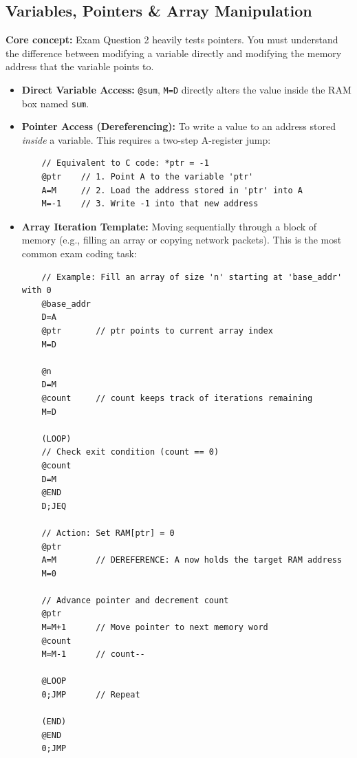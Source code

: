\documentclass[12pt,a4paper]{article}
\begin{document}
\subsection{Variables, Pointers \& Array Manipulation}
\textbf{Core concept:} Exam Question 2 heavily tests pointers. You must understand the difference between modifying a variable directly and modifying the memory address that the variable points to.
\begin{itemize}
    \item \textbf{Direct Variable Access:} \texttt{@sum}, \texttt{M=D} directly alters the value inside the RAM box named \texttt{sum}.
    \item \textbf{Pointer Access (Dereferencing):} To write a value to an address stored \textit{inside} a variable. This requires a two-step A-register jump:
    \begin{verbatim}
    // Equivalent to C code: *ptr = -1
    @ptr    // 1. Point A to the variable 'ptr'
    A=M     // 2. Load the address stored in 'ptr' into A
    M=-1    // 3. Write -1 into that new address
    \end{verbatim}
    \item \textbf{Array Iteration Template:} Moving sequentially through a block of memory (e.g., filling an array or copying network packets). This is the most common exam coding task:
    \begin{verbatim}
    // Example: Fill an array of size 'n' starting at 'base_addr' with 0
    @base_addr
    D=A
    @ptr       // ptr points to current array index
    M=D
    
    @n
    D=M
    @count     // count keeps track of iterations remaining
    M=D
    
    (LOOP)
    // Check exit condition (count == 0)
    @count
    D=M
    @END
    D;JEQ
    
    // Action: Set RAM[ptr] = 0
    @ptr
    A=M        // DEREFERENCE: A now holds the target RAM address
    M=0
    
    // Advance pointer and decrement count
    @ptr
    M=M+1      // Move pointer to next memory word
    @count
    M=M-1      // count--
    
    @LOOP
    0;JMP      // Repeat
    
    (END)
    @END
    0;JMP
    \end{verbatim}
\end{itemize}
\end{document}
